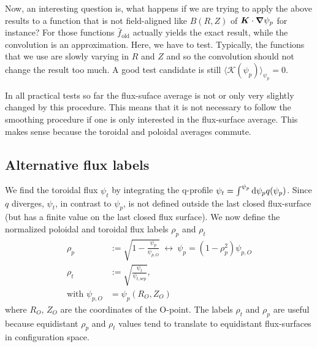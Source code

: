 Now, an interesting question is, what happens if we are trying to apply the above
results to a function that is not field-aligned like $B(R,Z)$ of ${\boldsymbol{K}}\cdot{\boldsymbol{\nabla}}\psi_p$ for instance? For those functions $\bar f_\mathrm{old}$ actually yields the exact
result, while the convolution is an approximation.
Here, we have to test.
Typically, the functions that we use are slowly varying in $R$ and $Z$ and
so the convolution should not change the result too much.
A good test candidate is still $\langle \mathcal K(\psi_p)\rangle_{\psi_p}=0$.

In all practical tests so far the flux-suface average is not or only very slightly changed by this procedure.
This means that it is not
necessary to follow the smoothing procedure if one is only interested in the flux-surface average.
This makes sense because the toroidal and poloidal averages commute.

\subsection{Alternative flux labels} \label{sec:alternative}
We find the toroidal flux $\psi_t$ by integrating the q-profile $\psi_t = \int^{\psi_p} \mathrm{d}\psi_p q(\psi_p)$. Since $q$ diverges, $\psi_t$, in contrast to $\psi_p$,
is not defined outside the last closed flux-surface (but has a finite value on the last closed flux surface). We now define the normalized poloidal and toroidal flux labels $\rho_p$ and $\rho_t$
\begin{align}
    \rho_p&:= \sqrt{1-\frac{\psi_p }{\psi_{p,O}}} \ \leftrightarrow\ \psi_p = (1-\rho_p^2)\psi_{p,O} \\
    \rho_t&:= \sqrt{\frac{\psi_t}{\psi_{t,\mathrm{sep}}}},\\
    \text{with }\psi_{p,O} &= \psi_p(R_O, Z_O)%
\end{align}
where $R_O$, $Z_O$ are the coordinates of the O-point.
The labels $\rho_t$ and $\rho_p$ are useful because
equidistant $\rho_p$ and $\rho_t$ values tend to translate to equidistant flux-surfaces
in configuration space.

